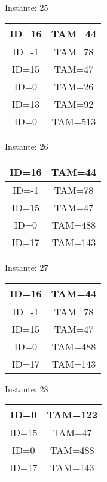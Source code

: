 \documentclass[10pt,a4paper]{article}
\begin{document}
\pagebreak
\begin{center}

Instante: 25

\begin{tabular}{|c|c|}
\hline
ID=16 & TAM=44 \\ \hline
ID=-1 & TAM=78 \\ \hline
ID=15 & TAM=47 \\ \hline
ID=0 & TAM=26 \\ \hline
ID=13 & TAM=92 \\ \hline
ID=0 & TAM=513 \\ \hline
\end{tabular}
\end{center}
\pagebreak
\begin{center}

Instante: 26

\begin{tabular}{|c|c|}
\hline
ID=16 & TAM=44 \\ \hline
ID=-1 & TAM=78 \\ \hline
ID=15 & TAM=47 \\ \hline
ID=0 & TAM=488 \\ \hline
ID=17 & TAM=143 \\ \hline
\end{tabular}
\end{center}
\pagebreak
\begin{center}

Instante: 27

\begin{tabular}{|c|c|}
\hline
ID=16 & TAM=44 \\ \hline
ID=-1 & TAM=78 \\ \hline
ID=15 & TAM=47 \\ \hline
ID=0 & TAM=488 \\ \hline
ID=17 & TAM=143 \\ \hline
\end{tabular}
\end{center}
\pagebreak
\begin{center}

Instante: 28

\begin{tabular}{|c|c|}
\hline
ID=0 & TAM=122 \\ \hline
ID=15 & TAM=47 \\ \hline
ID=0 & TAM=488 \\ \hline
ID=17 & TAM=143 \\ \hline
\end{tabular}
\end{center}
\end{document}
